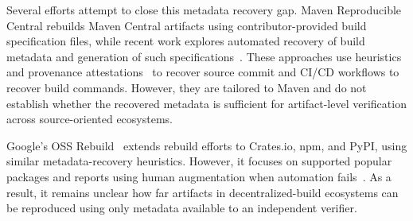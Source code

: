 Several efforts attempt to close this metadata recovery gap. 
Maven Reproducible Central rebuilds Maven Central artifacts using contributor-provided build specification files, while recent work explores automated recovery of build metadata and generation of such specifications~\cite{hassanshahiUnlockingReproducibilityAutomating2025,keshani_aroma_2024}. 
These approaches use heuristics and provenance attestations~\cite{noauthor_provenance_nodate} to recover source commit and CI/CD workflows to recover build commands. 
However, they are tailored to Maven and do not establish whether the recovered metadata is sufficient for artifact-level verification across source-oriented ecosystems.

Google's OSS Rebuild~\cite{google_oss_rebuild} extends rebuild efforts to Crates.io, npm, and PyPI, using similar metadata-recovery heuristics. However, it focuses on supported popular packages and reports using human augmentation when automation fails~\cite{noauthor_introducing_2025}. 
As a result, it remains unclear how far artifacts in decentralized-build ecosystems can be reproduced using only metadata available to an independent verifier.








